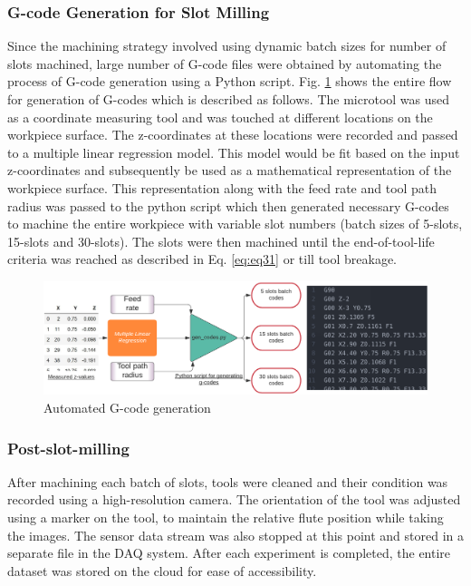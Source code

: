 \documentclass[preprint,review,12pt]{elsarticle}
\begin{document}
\subsubsection{G-code Generation for Slot Milling}
Since the machining strategy involved using dynamic batch sizes for number of slots machined, large number of G-code files were obtained by automating the process of G-code generation using a Python script. Fig. \ref{fig:fig38} shows the entire flow for generation of G-codes which is described as follows. The microtool was used as a coordinate measuring tool and was touched at different locations on the workpiece surface. The z-coordinates at these locations were recorded and passed to a multiple linear regression model. This model would be fit based on the input z-coordinates and subsequently be used as a mathematical representation of the workpiece surface. This representation along with the feed rate and tool path radius was passed to the python script which then generated necessary G-codes to machine the entire workpiece with variable slot numbers (batch sizes of 5-slots, 15-slots and 30-slots). The slots were then machined until the end-of-tool-life criteria was reached as described in Eq. \ref{eq:eq31} or till tool breakage. \par

\begin{figure}[!h]
  \begin{center}
    \includegraphics[width=\linewidth]{38.png}
    \caption{Automated G-code generation}\label{fig:fig38}
  \end{center}
\end{figure}

\subsubsection{Post-slot-milling}
After machining each batch of slots, tools were cleaned and their condition was recorded using a high-resolution camera. The orientation of the tool was adjusted using a marker on the tool, to maintain the relative flute position while taking the images. The sensor data stream was also stopped at this point and stored in a separate file in the DAQ system. After each experiment is completed, the entire dataset was stored on the cloud for ease of accessibility.\par
\end{document}
